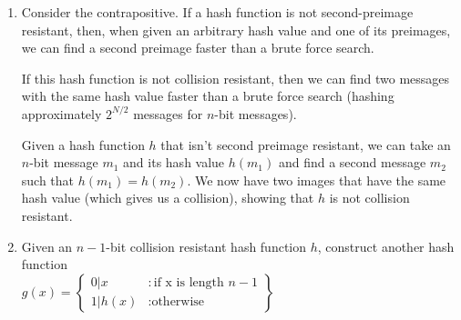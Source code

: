 
\begin{enumerate}
\item Consider the contrapositive. If a hash function is not second-preimage
  resistant, then, when given an arbitrary hash value and one of its preimages,
  we can find a second preimage faster than a brute force
  search.

If this hash function is not collision resistant, then we can find two
messages with the same hash value faster than a brute force search (hashing
approximately $2^{N/2}$ messages for $n$-bit messages).

Given a hash function $h$ that isn't second preimage resistant, we can take
an $n$-bit message $m_1$ and its hash value $h(m_1)$ and find a second
message $m_2$ such that $h(m_1) = h(m_2)$. We now have two images that have
the same hash value (which gives us a collision), showing that $h$ is not
collision resistant.

\item Given an $n-1$-bit collision resistant hash function $h$, construct
      another hash function \\
  $g(x) = \left\{
    \begin{array}{lr}
      0|x & : \text{if x is length }n-1\\
      1|h(x) & : \text{otherwise}
    \end{array}
    \right\}$ \\


\end{enumerate}
